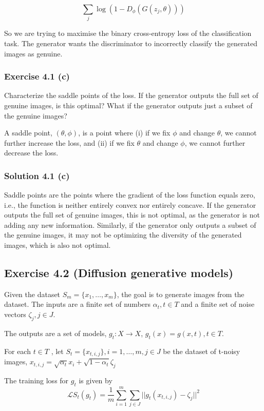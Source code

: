 \documentclass[
10pt, %
a4paper, %
oneside, %
headinclude,footinclude, %
BCOR5mm, %
]{scrartcl}
\begin{document}
\begin{equation*}
  \sum_j \log(1 - D_{\phi}(G(z_j, \theta)))
\end{equation*}

So we are trying to maximise the binary cross-entropy loss of the classification task. The generator wants the discriminator to incorrectly classify the generated images as genuine.

\subsubsection*{Exercise 4.1 (c)}
Characterize the saddle points of the loss. If the generator outputs the full set of genuine images, is this optimal? What if the generator outputs just a subset of the genuine images?

A saddle point, $(\theta, \phi)$, is a point where (i) if we fix $\phi$ and change $\theta$, we cannot further increase the loss, and (ii) if we fix $\theta$ and change $\phi$, we cannot further decrease the loss.

\subsubsection*{Solution 4.1 (c)}
Saddle points are the points where the gradient of the loss function equals zero, i.e., the function is neither entirely convex nor entirely concave. If the generator outputs the full set of genuine images, this is not optimal, as the generator is not adding any new information. Similarly, if the generator only outputs a subset of the genuine images, it may not be optimizing the diversity of the generated images, which is also not optimal.

\subsection*{Exercise 4.2 (Diffusion generative models)}
Given the dataset $S_m = \{x_1 , \ldots , x_m \}$, the goal is to generate images from the dataset. The inputs are a finite set of numbers $\alpha_t , t \in T$ and a finite set of noise vectors $\zeta_j , j \in J$.

The outputs are a set of models, $g_t : X \rightarrow X$, $g_t (x) = g(x, t), t \in T$.

For each $t \in T$ , let $S_t = \{x_{t,i,j}\}, i = 1, \ldots , m, j \in J$ be the dataset of t-noisy images, $x_{t,i,j} = \sqrt{\alpha_t} x_i + \sqrt{1 - \alpha_t} \zeta_j$

The training loss for $g_t$ is given by
\begin{equation*}
\mathcal{L} S_t (g_t ) = \frac{1}{m} \sum_{i=1}^{m} \sum_{j \in J} ||g_t (x_{t,i,j} ) - \zeta_j ||^2
\end{equation*}
\end{document}
